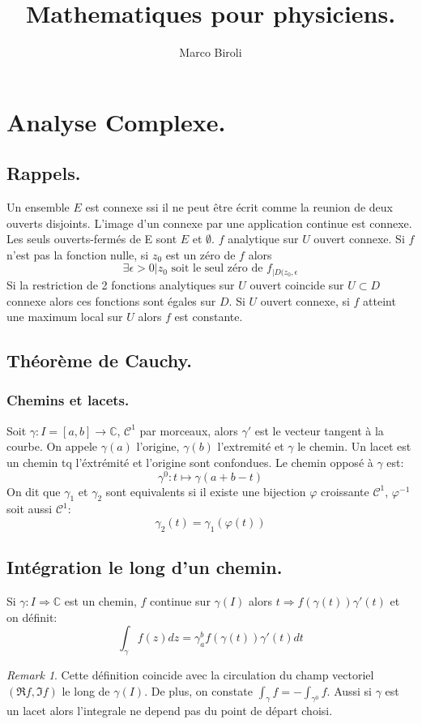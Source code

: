 \documentclass[10pt,a4paper]{article}
\author{Marco Biroli}
\title{Mathematiques pour physiciens.}
\theoremstyle{definition}
\theoremstyle{theorem}
\theoremstyle{remark}
\newtheorem*{remark}{Remark}
\begin{document}
\maketitle
\section{Analyse Complexe.}
\subsection{Rappels.}
 Un ensemble $E$ est connexe ssi il ne peut être écrit comme la reunion de deux ouverts disjoints.
\prop L'image d'un connexe par une application continue est connexe.
\prop Les seuls ouverts-fermés de E sont $E$ et $\emptyset$.
\theorem $f$ analytique sur $U$ ouvert connexe. Si $f$ n'est pas la fonction nulle, si $z_0$ est un zéro de $f$ alors
$$
\exists \epsilon > 0 | z_0 \text{ soit le seul zéro de } f_{|D(z_0, \epsilon}
$$
\theorem Si la restriction de 2 fonctions analytiques sur $U$ ouvert coincide sur $U \subset D$ connexe alors ces fonctions sont égales sur $D$.
\theorem Si $U$ ouvert connexe, si $f$ atteint une maximum local sur $U$ alors $f$ est constante.

\subsection{Théorème de Cauchy.}
\subsubsection{Chemins et lacets.}
 Soit $\gamma : I  = [a, b] \rightarrow \mathbb{C}$, $\mathcal{C}^1$ par morceaux, alors $\gamma'$ est le vecteur tangent à la courbe. On appele $\gamma(a)$ l'origine, $\gamma(b)$ l'extremité et $\gamma$ le chemin.
 Un lacet est un chemin tq l'éxtrémité et l'origine sont confondues.
 Le chemin opposé à $\gamma$ est:
$$
\gamma^0 : t \longmapsto \gamma(a+b-t)
$$
 On dit que $\gamma_1$ et $\gamma_2$ sont equivalents si il existe une bijection $\varphi$ croissante $\mathcal{C}^1$, $\varphi^{-1}$ soit aussi $\mathcal{C}^1$:
\[
\gamma_2(t) = \gamma_1(\varphi(t))
\]
\subsection{Intégration le long d'un chemin.}
 Si $\gamma : I \Rightarrow \mathbb{C}$ est un chemin, $f$ continue sur $\gamma(I)$ alors $t \Rightarrow f(\gamma(t))\gamma'(t)$ et on définit:
$$
\int_\gamma f(z) dz = \gamma_a^b f(\gamma(t))\gamma'(t) dt
$$
\begin{remark} Cette définition coincide avec la circulation du champ vectoriel $(\Re f, \Im f)$ le long de $\gamma(I)$. De plus, on constate $\int_\gamma f = - \int_{\gamma^0} f.$ Aussi si $\gamma$ est un lacet alors l'integrale ne depend pas du point de départ choisi.
\end{remark}
\end{document}
